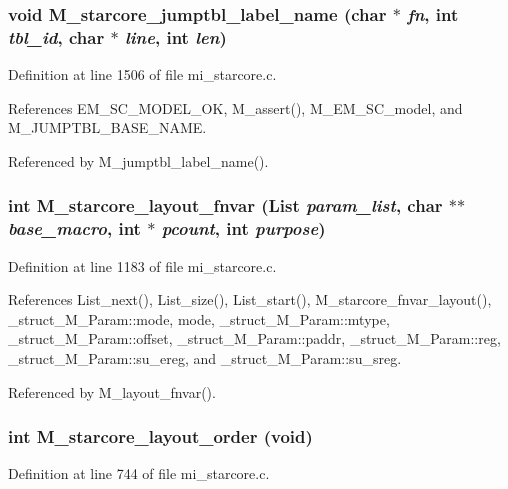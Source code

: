 \subsubsection{\setlength{\rightskip}{0pt plus 5cm}void M\_\-starcore\_\-jumptbl\_\-label\_\-name (char $\ast$ {\em fn}, int {\em tbl\_\-id}, char $\ast$ {\em line}, int {\em len})}\label{mi__starcore_8c_114735d22d67aec77ec867326fdd0f21}




Definition at line 1506 of file mi\_\-starcore.c.

References EM\_\-SC\_\-MODEL\_\-OK, M\_\-assert(), M\_\-EM\_\-SC\_\-model, and M\_\-JUMPTBL\_\-BASE\_\-NAME.

Referenced by M\_\-jumptbl\_\-label\_\-name().
\subsubsection{\setlength{\rightskip}{0pt plus 5cm}int M\_\-starcore\_\-layout\_\-fnvar (\bf{List} {\em param\_\-list}, char $\ast$$\ast$ {\em base\_\-macro}, int $\ast$ {\em pcount}, int {\em purpose})}\label{mi__starcore_8c_0ddcfaf509551bf7f543544953b37207}




Definition at line 1183 of file mi\_\-starcore.c.

References List\_\-next(), List\_\-size(), List\_\-start(), M\_\-starcore\_\-fnvar\_\-layout(), \_\-struct\_\-M\_\-Param::mode, mode, \_\-struct\_\-M\_\-Param::mtype, \_\-struct\_\-M\_\-Param::offset, \_\-struct\_\-M\_\-Param::paddr, \_\-struct\_\-M\_\-Param::reg, \_\-struct\_\-M\_\-Param::su\_\-ereg, and \_\-struct\_\-M\_\-Param::su\_\-sreg.

Referenced by M\_\-layout\_\-fnvar().
\subsubsection{\setlength{\rightskip}{0pt plus 5cm}int M\_\-starcore\_\-layout\_\-order (void)}\label{mi__starcore_8c_976396d3d486e2833fac9a71b066e06f}




Definition at line 744 of file mi\_\-starcore.c.

